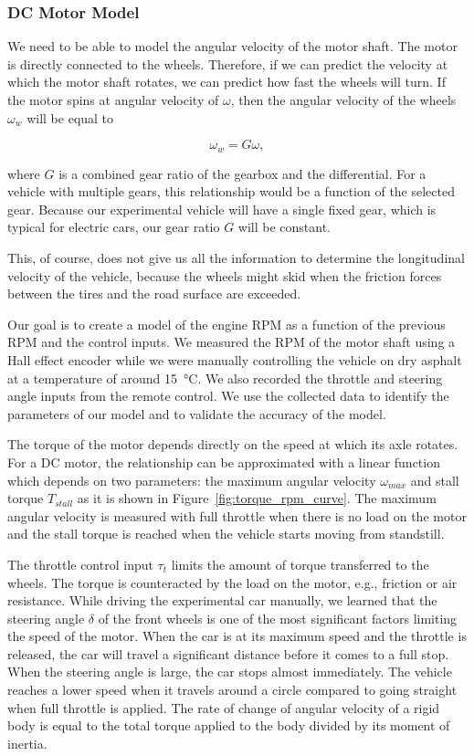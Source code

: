 \subsubsection{DC Motor Model}

We need to be able to model the angular velocity of the motor shaft. The motor is directly connected to the wheels. Therefore, if we can predict the velocity at which the motor shaft rotates, we can predict how fast the wheels will turn. If the motor spins at angular velocity of $\omega$, then the angular velocity of the wheels $\omega_w$ will be equal to

\[
\omega_w = G\omega,
\]

where $G$ is a combined gear ratio of the gearbox and the differential. For a vehicle with multiple gears, this relationship would be a function of the selected gear. Because our experimental vehicle will have a single fixed gear, which is typical for electric cars, our gear ratio $G$ will be constant.

This, of course, does not give us all the information to determine the longitudinal velocity of the vehicle, because the wheels might skid when the friction forces between the tires and the road surface are exceeded.

Our goal is to create a model of the engine RPM as a function of the previous \gls{RPM} and the control inputs. We measured the RPM of the motor shaft using a Hall effect encoder while we were manually controlling the vehicle on dry asphalt at a temperature of around \SI{15}{\degreeCelsius}. We also recorded the throttle and steering angle inputs from the remote control. We use the collected data to identify the parameters of our model and to validate the accuracy of the model.

The torque of the motor depends directly on the speed at which its axle rotates. For a DC motor, the relationship can be approximated with a linear function which depends on two parameters: the maximum angular velocity $\omega_{max}$ and stall torque $T_{stall}$ as it is shown in Figure~\ref{fig:torque_rpm_curve}. The maximum angular velocity is measured with full throttle when there is no load on the motor and the stall torque is reached when the vehicle starts moving from standstill.

The throttle control input $\tau_t$ limits the amount of torque transferred to the wheels. The torque is counteracted by the load on the motor, e.g., friction or air resistance. While driving the experimental car manually, we learned that the steering angle $\delta$ of the front wheels is one of the most significant factors limiting the speed of the motor. When the car is at its maximum speed and the throttle is released, the car will travel a significant distance before it comes to a full stop. When the steering angle is large, the car stops almost immediately. The vehicle reaches a lower speed when it travels around a circle compared to going straight when full throttle is applied. The rate of change of angular velocity of a rigid body is equal to the total torque applied to the body divided by its moment of inertia.


